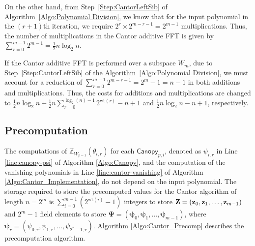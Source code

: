 On the other hand, from Step~\ref{Step:CantorLeftSib} of Algorithm~\ref{Algo:Polynomial Division}, we know that for the input polynomial in the $(r+1)$th iteration, we require $2^r \times 2^{m-r-1}= 2^{m-1}$ multiplications. Thus, the number of multiplications in the Cantor additive FFT is given by
\(\sum_{r=0}^{m-1} 2^{m-1} = \frac{1}{2} n \log_2 n .\)

If the Cantor additive FFT is performed over a subspace $W_m$, due to Step~\ref{Step:CantorLeftSib} of the Algorithm~\ref{Algo:Polynomial Division}, we must account for a reduction of $\sum_{r=0}^{m-1} 2^{m-r-1}=2^m-1=n-1$ in both additions and multiplications. Thus, the costs for additions and multiplications are changed to
$\frac{1}{2} n\log_2 n + \frac{1}{2}n \sum_{r=0}^{\log_2(n)-1} 2^{\text{wt}(r)} -n +1$ and $\frac{1}{2} n \log_2 n-n+1$, respectively.

\subsection{Precomputation} \label{sec:cantor_precmp}


The computations of $\mathbb{Z}_{W_{p-1}}(\theta_{i, r})$ for each \(\mathsf{Canopy}_{p, i}\), denoted as $\psi_{i, r}$ in Line \ref{line:canopy-psi} of Algorithm \ref{Algo:Canopy}, and the computation of the vanishing polynomials in Line \ref{line:cantor-vanishing} of Algorithm \ref{Algo:Cantor_Implementation}, do not depend on the input polynomial. 
The storage required to store the precomputed values for the Cantor algorithm of length $n = 2^m$ is 
$
\sum_{i=0}^{m-1} \left(2^{\text{wt}(i)} - 1\right)
$
integers to store $\mathbf{Z} = ({\bf{z}}_0, {\bf{z}}_1, \ldots, {\bf{z}}_{m-1})$ and $2^m - 1$ field elements to store $\boldsymbol{\Psi} = (\boldsymbol{\psi}_0, \boldsymbol{\psi}_1, \ldots, \boldsymbol{\psi}_{m-1})$, where $\boldsymbol{\psi}_r = ( \psi_{0,r}, \psi_{1,r}, \ldots, \psi_{2^r-1,r} )$. Algorithm \ref{Algo:Cantor_Precomp}  describes the precomputation algorithm. 

